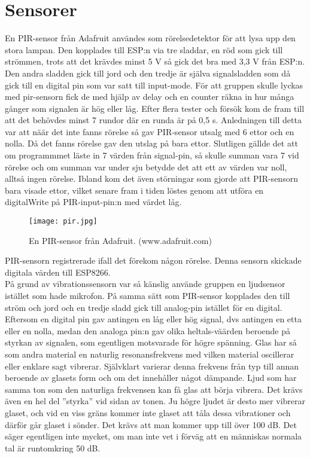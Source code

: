 \section{Sensorer}
En PIR-sensor från Adafruit användes som rörelsedetektor för att lysa upp den stora lampan. Den kopplades till ESP:n via tre sladdar, en röd som gick till strömmen, trots att det krävdes minst 5 V så gick det bra med 3,3 V från ESP:n. Den andra sladden gick till jord och den tredje är själva signalsladden som då gick till en digital pin som var satt till input-mode. För att gruppen skulle lyckas med pir-sensorn fick de med hjälp av delay och en counter räkna in hur många gånger som signalen är hög eller låg. Efter flera tester och försök kom de fram till att det behövdes minst 7 rundor där en runda är på 0,5 s. Anledningen till detta var att näär det inte fanns rörelse så gav PIR-sensor utsalg med 6 ettor och en nolla. Då det fanns rörelse gav den utslag på bara ettor. Slutligen gällde det att om programmmet läste in 7 värden från signal-pin, så skulle summan vara 7 vid rörelse och om summan var under sju betydde det att ett av värden var noll, alltså ingen rörelse. Ibland kom det även störningar som gjorde att PIR-sensorn bara visade ettor, vilket senare fram i tiden löstes genom att utföra en digitalWrite på PIR-input-pin:n med värdet låg.  \\

\begin{figure}[h]

  \texttt{[image: pir.jpg]}
  \caption{En PIR-sensor från Adafruit. (www.adafruit.com)}
  \label{fig:pir}
\end{figure}
PIR-sensorn registrerade ifall det förekom någon rörelse. Denna sensorn skickade digitala värden till ESP8266.\\

På grund av vibrationssensorn var så känslig använde gruppen en ljudsensor istället som hade mikrofon. På samma sätt som PIR-sensor kopplades den till ström och jord och en tredje sladd gick till analog-pin istället för en digital. Eftersom en digital pin gav antingen en låg eller hög signal, dvs antingen en etta eller en nolla, medan den analoga pin:n gav olika heltals-väärden beroende på styrkan av signalen, som egentligen motsvarade för högre spänning. 
Glas har så som andra material en naturlig resonansfrekvens med vilken material oscillerar eller enklare sagt vibrerar. Självklart varierar denna frekvens från typ till annan beroende av glasets form och om det innehåller något dämpande. Ljud som har samma ton som den naturliga frekvensen kan få glas att börja vibrera. Det krävs även en hel del ”styrka” vid sidan av tonen. Ju högre ljudet är desto mer vibrerar glaset, och vid en viss gräns kommer inte glaset att tåla dessa vibrationer och därför går glaset i sönder. Det krävs att man kommer upp till över 100 dB. Det säger egentligen inte mycket, om man inte vet i förväg att en människas normala tal är runtomkring 50 dB. 

